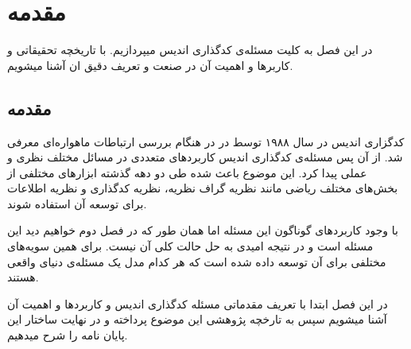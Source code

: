 \chapter{مقدمه}
\label{chapter:introduction}

در این فصل به کلیت مسئله‌ی کدگذاری اندیس میپردازیم. با تاریخچه تحقیقاتی و کاربرها و اهمیت آن در صنعت و تعریف دقیق ان آشنا میشویم.
\pagebreak

\section{مقدمه}

کدگزاری اندیس در سال ۱۹۸۸ توسط در
\cite{ISCOD}
در هنگام بررسی ارتباطات ماهواره‌ای معرفی شد. از آن پس مسئله‌ی کدگذاری اندیس کاربردهای متعددی در مسائل مختلف نظری و عملی پیدا کرد. این موضوع باعث شده طی دو دهه گذشته ابزارهای مختلفی از بخش‌های مختلف ریاضی مانند نظریه گراف نظریه، نظریه کدگذاری و نظریه اطلاعات برای توسعه آن استفاده شوند.

	با وجود کاربردهای گوناگون این مسئله اما همان طور که در فصل دوم خواهیم دید این مسئله
است و در نتیجه امیدی به حل حالت کلی آن نیست. برای همین سویه‌های مختلفی برای آن توسعه داده شده است که هر کدام مدل یک مسئله‌ی دنیای واقعی هستند.

در این فصل ابتدا با تعریف مقدماتی مسئله کدگذاری اندیس و کاربردها و اهمیت آن آشنا میشویم سپس به تارخچه پژوهشی این موضوع پرداخته و در نهایت ساختار این پایان نامه را شرح میدهیم.

